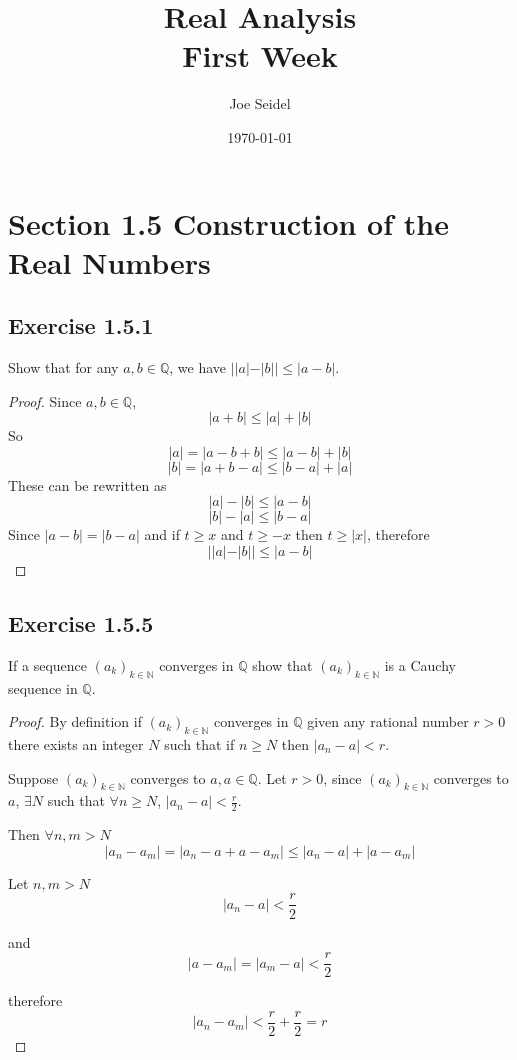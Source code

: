 \documentclass{tufte-book}
\title{Real Analysis\\First Week }
\author{Joe Seidel}
\date{\today}
\theoremstyle{mytheoremstyle}
\theoremstyle{mylemstyle}
\theoremstyle{mydefstyle}
\begin{document}
\maketitle
{}
\newpage
{}

\section{Section 1.5 Construction of the Real Numbers}

\subsection{Exercise 1.5.1} 

Show that for any $a, b \in \mathbb{Q}$, we have $||a|-|b|| \leq |a-b|$.

\begin{proof} Since $a,b \in \mathbb{Q}$, 
\[|a+b| \leq |a|+|b|\]
So
\[|a|=|a-b+b| \leq |a-b| + |b|\]
\[|b|=|a+b-a| \leq |b-a| + |a|\]
These can be rewritten as 
\[|a|-|b| \leq |a-b|\]
\[|b|-|a| \leq |b-a|\]
Since $|a-b|=|b-a|$ and if $t \geq x$ and $t \geq -x$ then $t \geq |x|$, therefore 
\[||a|-|b|| \leq |a-b| \]\end{proof}

\subsection{Exercise 1.5.5}
If a sequence $(a_k)_{k \in \mathbb{N}}$ converges in $\mathbb{Q}$ show that 
$(a_k)_{k \in \mathbb{N}}$ is a Cauchy sequence in $\mathbb{Q}$.

\begin{proof}By definition if $(a_k)_{k \in \mathbb{N}}$ converges in $\mathbb{Q}$ given any rational number $r > 0$ there exists an integer $N$ such that if $n \geq N$ then $|a_n-a|<r$. 

Suppose $(a_k)_{k \in \mathbb{N}}$ converges to $a, a \in \mathbb{Q}$. Let $r>0$, since $(a_k)_{k \in \mathbb{N}}$ converges to $a$,  $\exists N$ such that $\forall n \geq N$, $|a_n-a| < \frac{r}{2}$.

Then $\forall n,m > N$
\[|a_n-a_m| = |a_n-a+a-a_m| \leq |a_n-a| + |a-a_m|\]

Let $n,m > N$ 
\[|a_n-a| < \frac{r}{2}\]

and
\[|a-a_m| = |a_m-a| < \frac{r}{2}\]

therefore
\[|a_n-a_m|< \frac{r}{2} + \frac{r}{2} = r\]
\end{proof}
\end{document}

